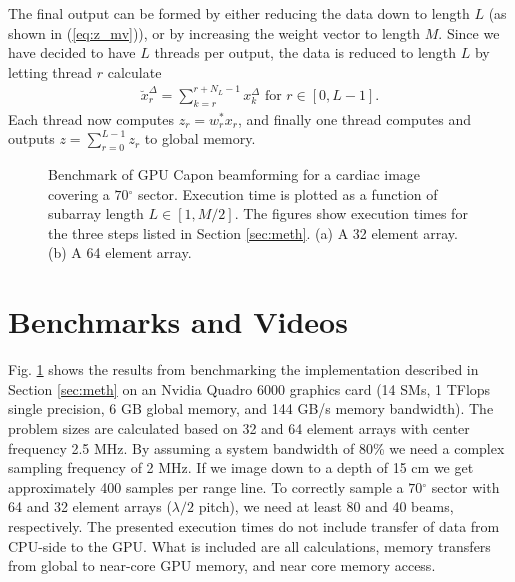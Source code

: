\documentclass[conference]{IEEEtran}
\newcommand{\degree}{\ensuremath{^\circ}}
\begin{document}
The final output can be formed by either reducing the data down to length $L$ (as shown in (\ref{eq:z_mv})), or by increasing the weight vector to length $M$. Since we have decided to have $L$ threads per output, the data is reduced to length $L$ by letting thread $r$ calculate 
\begin{align}
\breve{x}_{r}^{\Delta} = \sum_{k=r}^{r+N_L-1}x_{k}^{\Delta} \text{ for } r \in [0, L-1].
\end{align}
Each thread now computes $z_r = w_r^*x_r$, and finally one thread computes and outputs $z = \sum_{r=0}^{L-1} z_r$ to global memory.

\begin{figure}[!t]
\centerline{
\hfil
{}}
\caption{Benchmark of GPU Capon beamforming for a cardiac image covering a $70\degree$ sector. Execution time is plotted as a function of subarray length $L \in [1, M/2]$. The figures show execution times for the three steps listed in Section \ref{sec:meth}. (a) A 32 element array. (b) A 64 element array.}
\label{fig:bench}
\end{figure}

\section{Benchmarks and Videos}
Fig. \ref{fig:bench} shows the results from benchmarking the implementation described in Section \ref{sec:meth} on an Nvidia Quadro 6000 graphics card (14 SMs, 1 TFlops single precision, 6 GB global memory, and 144 GB/s memory bandwidth). The problem sizes are calculated based on 32 and 64 element arrays with center frequency 2.5 MHz. By assuming a system bandwidth of 80\% we need a complex sampling frequency of 2 MHz. If we image down to a depth of 15 cm we get approximately 400 samples per range line. To correctly sample a $70\degree$ sector with 64 and 32 element arrays ($\lambda/2$ pitch), we need at least 80 and 40 beams, respectively. The presented execution times do not include transfer of data from CPU-side to the GPU. What is included are all calculations, memory transfers from global to near-core GPU memory, and near core memory access. 
\end{document}
